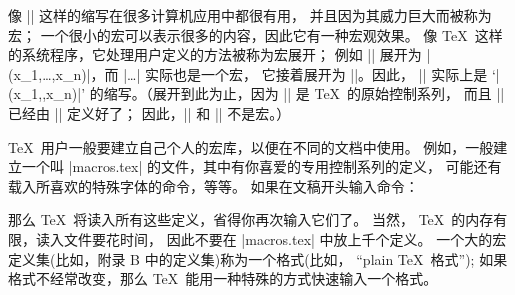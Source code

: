 像 |\xvec| 这样的缩写在很多计算机应用中都很有用，
并且因为其威力巨大而被称为{宏}；
一个很小的宏可以表示很多的内容，因此它有一种宏观效果。
像 \TeX\ 这样的系统程序，它处理用户定义的方法被称为{宏展开}；
例如 |\xvec| 展开为 |(x_1,\ldots,x_n)|，而 |\ldots| 实际也是一个宏，
它接着展开为 |\mathinner{\ldotp\ldotp|\allowbreak |\ldotp}|。因此，
|\xvec| 实际上是 `|(x_1,\mathinner{\ldotp\ldotp|\allowbreak|\ldotp},x_n)|'
的缩写。（展开到此为止，因为 |\mathinner| 是 \TeX\ 的原始控制系列，
而且 |\ldotp| 已经由 |\mathchardef| 定义好了；
因此，|\mathinner| 和 |\ldotp| 不是宏。）

%
 \TeX\ 用户一般要建立自己个人的宏库，以便在不同的文档中使用。%
例如，一般建立一个叫 |macros.tex| 的文件，其中有你喜爱的专用控制系列的定义，
可能还有载入所喜欢的特殊字体的命令，等等。%
如果在文稿开头输入命令：
\begintt

\endtt
那么 \TeX\ 将读入所有这些定义，省得你再次输入它们了。%
当然， \TeX\ 的内存有限，读入文件要花时间，
因此不要在 |macros.tex| 中放上千个定义。%
\1一个大的宏定义集(比如，附录 B 中的定义集)称为一个{格式}(比如，%
``plain \TeX\ 格式'');
如果格式不经常改变，那么 \TeX\ 能用一种特殊的方式快速输入一个格式。

